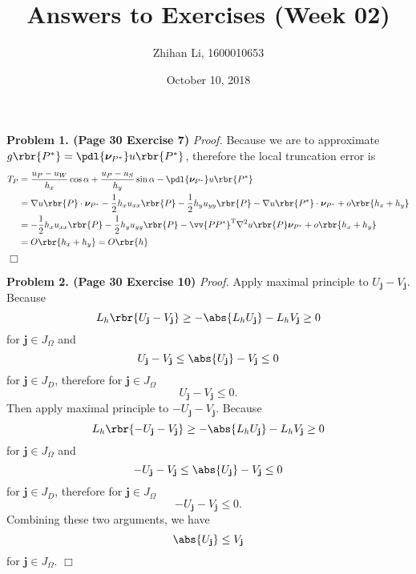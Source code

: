 \documentclass[english, nochinese]{pnote}
\title{Answers to Exercises (Week 02)}
\author{Zhihan Li, 1600010653}
\date{October 10, 2018}
\begin{document}
\maketitle

\textbf{Problem 1. (Page 30 Exercise 7)} \textit{Proof.} Because we are to approximate $ g \rbr{P^{\ast}} = \pdl{\bm{\nu}_{P^{\ast}}} u \rbr{P^{\ast}} $, therefore the local truncation error is
\begin{equation}
\begin{split}
T_P &= \frac{ u_P - u_W }{h_x} \cos \alpha + \frac{ u_P - u_S }{h_y} \sin \alpha - \pdl{\bm{\nu}_{P^{\ast}}} u \rbr{P^{\ast}} \\
&= \nabla u \rbr{P} \cdot \bm{\nu}_{P^{\ast}} - \frac{1}{2} h_x u_{ x x } \rbr{P} - \frac{1}{2} h_y u_{ y y } \rbr{P} - \nabla u \rbr{P^{\ast}} \cdot \bm{\nu}_{P^{\ast}} + o \rbr{ h_x + h_y } \\
&= -\frac{1}{2} h_x u_{ x x } \rbr{P} - \frac{1}{2} h_y u_{ y y } \rbr{P} - \vv{ P P^{\ast} }^{\text{T}} \nabla^2 u \rbr{P} \bm{\nu}_{P^{\ast}} + o \rbr{ h_x + h_y } \\
&= O \rbr{ h_x + h_y } = O \rbr{h}
\end{split}
\end{equation}
\hfill$\Box$

\textbf{Problem 2. (Page 30 Exercise 10)} \textit{Proof.} Apply maximal principle to $ U_{\mathbf{j}} - V_{\mathbf{j}} $. Because
\begin{equation}
L_h \rbr{ U_{\mathbf{j}} - V_{\mathbf{j}} } \ge -\abs{ L_h U_{\mathbf{j}} } - L_h V_{\mathbf{j}} \ge 0
\end{equation}
for $ \mathbf{j} \in J_{\Omega} $ and
\begin{equation}
U_{\mathbf{j}} - V_{\mathbf{j}} \le \abs{U_{\mathbf{j}}} - V_{\mathbf{j}} \le 0
\end{equation}
for $ \mathbf{j} \in J_D $,
therefore for $ \mathbf{j} \in J_{\Omega} $
\begin{equation}
U_{\mathbf{j}} - V_{\mathbf{j}} \le 0.
\end{equation}
Then apply maximal principle to $ -U_{\mathbf{j}} - V_{\mathbf{j}} $. Because
\begin{equation}
L_h \rbr{ -U_{\mathbf{j}} - V_{\mathbf{j}} } \ge -\abs{ L_h U_{\mathbf{j}} } - L_h V_{\mathbf{j}} \ge 0
\end{equation}
for $ \mathbf{j} \in J_{\Omega} $ and
\begin{equation}
-U_{\mathbf{j}} - V_{\mathbf{j}} \le \abs{U_{\mathbf{j}}} - V_{\mathbf{j}} \le 0
\end{equation}
for $ \mathbf{j} \in J_D $,
therefore for $ \mathbf{j} \in J_{\Omega} $
\begin{equation}
-U_{\mathbf{j}} - V_{\mathbf{j}} \le 0.
\end{equation}
Combining these two arguments, we have
\begin{equation}
\abs{U_{\mathbf{j}}} \le V_{\mathbf{j}}
\end{equation}
for $ \mathbf{j} \in J_{\Omega} $.
\hfill$\Box$
\end{document}
